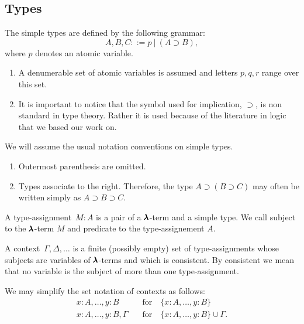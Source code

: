 
\subsection{Types}

\begin{definition}
  The simple types are defined by the following grammar:  
  \[
    A, B, C ::= p \ | \ (A \supset B),
  \]
  where $p$ denotes an atomic variable.
\end{definition}

\begin{remark} \hfill
  \begin{enumerate}
  \item A denumerable set of atomic variables is assumed and letters $p, q, r$ range over this set.
  \item It is important to notice that the symbol used for implication, $\supset$, is non standard in type theory.
    Rather it is used because of the literature in logic that we based our work on.
  \end{enumerate}
\end{remark}

\begin{notation}
  We will assume the usual notation conventions on simple types. 
  \begin{enumerate}
  \item Outermost parenthesis are omitted.
  \item Types associate to the right. Therefore, the type $A \supset (B \supset C)$ may often be written simply as $A \supset B \supset C$.
  \end{enumerate}
\end{notation}

\begin{definition}
  A type-assignment~$M : A$ is a pair of a $\pmb{\lambda}$-term and a simple type.
  We call subject to the $\pmb{\lambda}$-term $M$ and predicate to the type-assignement $A$.
\end{definition}

\begin{definition}[Context]
  A context~$\Gamma, \Delta, \dots$ is a finite (possibly empty) set of type-assignments whose subjects are variables of $\pmb{\lambda}$-terms and which is consistent. By consistent we mean that no variable is the subject of more than one type-assignment.
\end{definition}

\begin{notation} We may simplify the set notation of contexts as follows:
  \begin{align*}
    x:A, \dots, y:B         \quad &\text{for} \quad \{ x:A, \dots, y:B \} \\
    x:A, \dots, y:B, \Gamma \quad &\text{for} \quad \{ x:A, \dots, y:B \} \cup \Gamma.
  \end{align*}
\end{notation}

